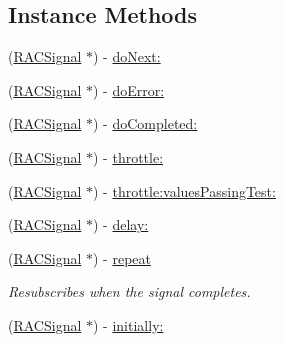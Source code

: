 \subsection*{Instance Methods}
\begin{DoxyCompactItemize}
\item 
(\mbox{\hyperlink{interface_r_a_c_signal}{R\+A\+C\+Signal}} $\ast$) -\/ \mbox{\hyperlink{category_r_a_c_signal_07_operations_08_a36028c2d987159f5210840358f4877c9}{do\+Next\+:}}
\item 
(\mbox{\hyperlink{interface_r_a_c_signal}{R\+A\+C\+Signal}} $\ast$) -\/ \mbox{\hyperlink{category_r_a_c_signal_07_operations_08_ac97a1fc7c03123a75746f2602b7444b4}{do\+Error\+:}}
\item 
(\mbox{\hyperlink{interface_r_a_c_signal}{R\+A\+C\+Signal}} $\ast$) -\/ \mbox{\hyperlink{category_r_a_c_signal_07_operations_08_af88fe4c330bad925ed164ad8f12bdcc8}{do\+Completed\+:}}
\item 
(\mbox{\hyperlink{interface_r_a_c_signal}{R\+A\+C\+Signal}} $\ast$) -\/ \mbox{\hyperlink{category_r_a_c_signal_07_operations_08_a2542ae804d05ec734d0f4d2fa8c3ac93}{throttle\+:}}
\item 
(\mbox{\hyperlink{interface_r_a_c_signal}{R\+A\+C\+Signal}} $\ast$) -\/ \mbox{\hyperlink{category_r_a_c_signal_07_operations_08_a0310fbee83b4ca1b1daca25daf24f41b}{throttle\+:values\+Passing\+Test\+:}}
\item 
(\mbox{\hyperlink{interface_r_a_c_signal}{R\+A\+C\+Signal}} $\ast$) -\/ \mbox{\hyperlink{category_r_a_c_signal_07_operations_08_adc28e5c64d2e6ec8c5ab8465fa6c89b4}{delay\+:}}
\item 
\mbox{\label{category_r_a_c_signal_07_operations_08_a37268af56c884572c44827ba13367c2d}} 
(\mbox{\hyperlink{interface_r_a_c_signal}{R\+A\+C\+Signal}} $\ast$) -\/ \mbox{\hyperlink{category_r_a_c_signal_07_operations_08_a37268af56c884572c44827ba13367c2d}{repeat}}
\begin{DoxyCompactList}\small\item\em Resubscribes when the signal completes. \end{DoxyCompactList}\item 
(\mbox{\hyperlink{interface_r_a_c_signal}{R\+A\+C\+Signal}} $\ast$) -\/ \mbox{\hyperlink{category_r_a_c_signal_07_operations_08_a2c8566a5d3b5997357d34ee5991a2e0c}{initially\+:}}
\item 
\mbox{\label{category_r_a_c_signal_07_operations_08_ae07531acf550fb75812c77adfffc0bb7}} 

\end{DoxyCompactItemize}
